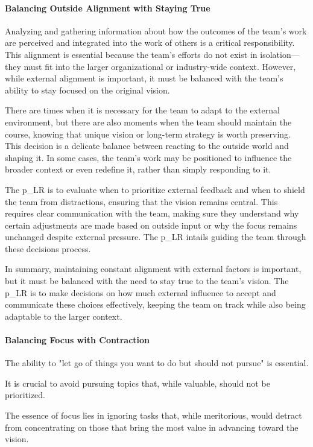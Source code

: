\paragraph{Balancing Outside Alignment with Staying True}

Analyzing and gathering information about how the outcomes of the team's work are perceived and integrated into the work of others is a critical responsibility. This alignment is essential because the team's efforts do not exist in isolation—they must fit into the larger organizational or industry-wide context. However, while external alignment is important, it must be balanced with the team’s ability to stay focused on the original vision. 

There are times when it is necessary for the team to adapt to the external environment, but there are also moments when the team should maintain the course, knowing that unique vision or long-term strategy is worth preserving. This decision is a delicate balance between reacting to the outside world and shaping it. In some cases, the team’s work may be positioned to influence the broader context or even redefine it, rather than simply responding to it.

The \gls{p_LR} is to evaluate when to prioritize external feedback and when to shield the team from distractions, ensuring that the vision remains central. This requires clear communication with the team, making sure they understand why certain adjustments are made based on outside input or why the focus remains unchanged despite external pressure. The \gls{p_LR} intails guiding the team through these decisions process.

In summary, maintaining constant alignment with external factors is important, but it must be balanced with the need to stay true to the team’s vision. The \gls{p_LR} is to make decisions on how much external influence to accept and communicate these choices effectively, keeping the team on track while also being adaptable to the larger context.

\paragraph{Balancing Focus with Contraction}

The ability to "let go of things you want to do but should not pursue" is essential.

It is crucial to avoid pursuing topics that, while valuable, should not be prioritized. \begin{center} The essence of focus lies in ignoring tasks that, while meritorious, would detract from concentrating on those that bring the most value in advancing toward the vision. \end{center}

